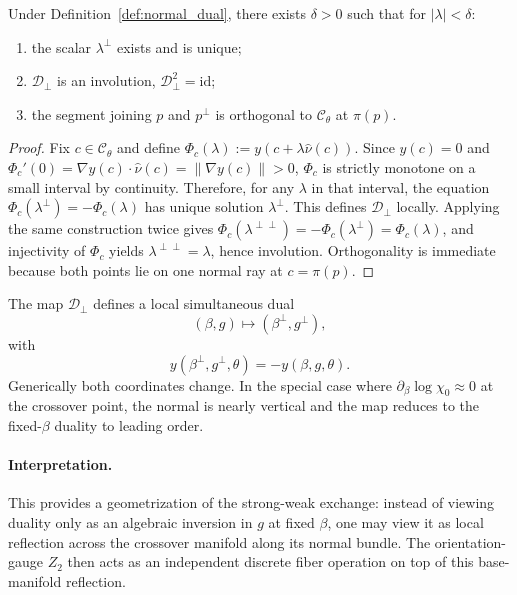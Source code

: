 \begin{theorem}
\label{thm:normal_duality}
Under Definition~\ref{def:normal_dual}, there exists \(\delta>0\) such that for
\(|\lambda|<\delta\):
\begin{enumerate}
  \item the scalar \(\lambda^\perp\) exists and is unique;
  \item \(\mathcal{D}_\perp\) is an involution, \(\mathcal{D}_\perp^2=\mathrm{id}\);
  \item the segment joining \(p\) and \(p^\perp\) is orthogonal to \(\mathcal{C}_\theta\) at
  \(\pi(p)\).
\end{enumerate}
\end{theorem}
\begin{proof}
Fix \(c\in\mathcal{C}_\theta\) and define \(\Phi_c(\lambda):=y(c+\lambda\hat{\nu}(c))\).
Since \(y(c)=0\) and \(\Phi_c'(0)=\nabla y(c)\!\cdot\!\hat{\nu}(c)=\|\nabla y(c)\|>0\), \(\Phi_c\)
is strictly monotone on a small interval by continuity. Therefore, for any \(\lambda\) in that
interval, the equation \(\Phi_c(\lambda^\perp)=-\Phi_c(\lambda)\) has unique solution
\(\lambda^\perp\). This defines \(\mathcal{D}_\perp\) locally. Applying the same construction twice
gives \(\Phi_c(\lambda^{\perp\perp})=-\Phi_c(\lambda^\perp)=\Phi_c(\lambda)\), and injectivity of
\(\Phi_c\) yields \(\lambda^{\perp\perp}=\lambda\), hence involution. Orthogonality is immediate
because both points lie on one normal ray at \(c=\pi(p)\).
\end{proof}

\begin{corollary}
\label{cor:simultaneous_beta_g_dual}
The map \(\mathcal{D}_\perp\) defines a local simultaneous dual
\begin{equation}
  (\beta,g)\mapsto(\beta^\perp,g^\perp),
\end{equation}
with
\begin{equation}
  y(\beta^\perp,g^\perp,\theta)=-y(\beta,g,\theta).
\end{equation}
Generically both coordinates change. In the special case where
\(\partial_\beta\log\chi_0\approx 0\) at the crossover point, the normal is nearly vertical and the
map reduces to the fixed-\(\beta\) duality to leading order.
\end{corollary}

\paragraph{Interpretation.}
This provides a geometrization of the strong-weak exchange: instead of viewing duality only as an
algebraic inversion in \(g\) at fixed \(\beta\), one may view it as local reflection across the
crossover manifold along its normal bundle. The orientation-gauge \(Z_2\) then acts as an
independent discrete fiber operation on top of this base-manifold reflection.

